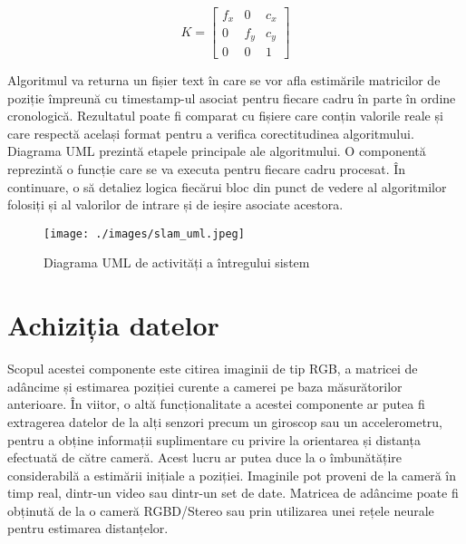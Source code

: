 \documentclass[12pt,a4paper]{report}
\begin{document}
\begin{equation}
    K = 
    \begin{bmatrix}
        f_x & 0   & c_x \\
        0   & f_y & c_y \\
        0   & 0   & 1
    \end{bmatrix}
\end{equation}

Algoritmul va returna un fișier text în care se vor afla estimările matricilor 
de poziție împreună cu timestamp-ul asociat pentru fiecare cadru în parte în ordine
cronologică. Rezultatul poate fi comparat cu fișiere care conțin valorile reale și 
care respectă același format pentru a verifica corectitudinea algoritmului.   
Diagrama UML prezintă etapele principale ale algoritmului. O componentă 
reprezintă o funcție care se va executa pentru fiecare cadru procesat.  
În continuare, o să detaliez logica fiecărui bloc din punct de vedere al algoritmilor folosiți și 
al valorilor de intrare și de ieșire asociate acestora.

\begin{figure}[htbp] 
  \centering
  \texttt{[image: ./images/slam\_uml.jpeg]}
  \caption{Diagrama UML de activități a întregului sistem}\label{fig:slam_uml_fig}
\end{figure}
 
\section{Achiziția datelor}
Scopul acestei componente este citirea imaginii de tip RGB, a matricei de adâncime 
și estimarea poziției curente a camerei pe baza măsurătorilor anterioare. În viitor,
o altă funcționalitate a acestei componente ar putea fi extragerea datelor de la alți senzori 
precum un giroscop sau un accelerometru, pentru a obține informații suplimentare cu privire
la orientarea și distanța efectuată de către cameră. Acest lucru ar putea duce la o îmbunătățire
considerabilă a estimării inițiale a poziției. Imaginile pot proveni de la cameră în timp real, 
dintr-un video sau dintr-un set de date. Matricea de adâncime poate fi obținută de la o cameră 
RGBD/Stereo sau prin utilizarea unei rețele neurale pentru estimarea distanțelor. 
\end{document}
